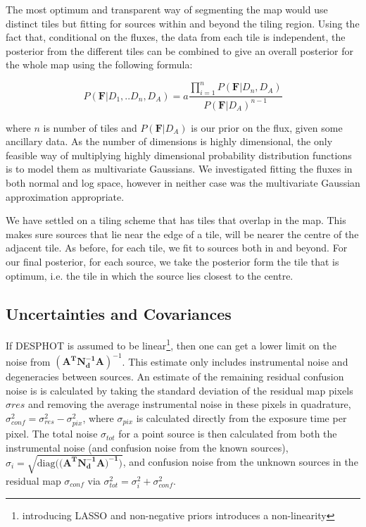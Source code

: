 \documentclass[useAMS,usenatbib]{mn2e}
\begin{document}
The most optimum and transparent way of segmenting the map would use distinct tiles but fitting for sources within and beyond the tiling region. Using the fact that, conditional on the fluxes, the data from each tile is independent, the posterior from the different tiles can be combined to give an overall posterior for the whole map using the following formula:

\begin{equation}
P(\mathbf{F}|D_1,..D_n,D_A)=a\frac{\prod_{i=1}^n P(\mathbf{F}|D_n,D_A)}{P(\mathbf{F}|D_A)^{n-1}}
\end{equation}

where $n$ is number of tiles and $P(\mathbf{F}|D_A)$ is our prior on the flux, given some ancillary data. As the number of dimensions is highly dimensional, the only feasible way of multiplying highly dimensional probability distribution functions is to model them as multivariate Gaussians. We investigated fitting the fluxes in both normal and log space, however in neither case was the multivariate Gaussian approximation appropriate.

We have settled on a tiling scheme that has tiles that overlap in the map. This makes sure sources that lie near the edge of a tile, will be nearer the centre of the adjacent tile. As before, for each tile, we fit to sources both in and beyond. For our final posterior, for each source, we take the posterior form the tile that is optimum, i.e. the tile in which the source lies closest to the centre.

\subsection{Uncertainties and Covariances}
If DESPHOT is assumed to be linear\footnote{introducing LASSO and non-negative priors introduces a non-linearity}, then one can get a lower limit on the noise from $(\mathbf{A^TN_d^{-1}A})^{-1}$. This estimate only includes instrumental noise and degeneracies between sources. An estimate of the remaining residual confusion noise is is calculated by taking the standard deviation of the residual map pixels $\sigma{res}$ and removing the average instrumental noise in these pixels in quadrature, $\sigma^2_{conf} = \sigma^2_{res} - \sigma^2_{pix}$, where $\sigma_{pix}$ is calculated directly from the exposure time per pixel. The total noise $\sigma_{tot}$ for a point source is then calculated from both the instrumental noise (and confusion noise from the known sources), $\sigma_{i} = \sqrt{\mathrm{diag}((\mathbf{A^TN^{-1}_dA)^{-1})}}$, and confusion noise from the unknown sources in the residual map $\sigma_{conf}$ via $\sigma^2_{tot} = \sigma^2_{i} + \sigma^2_{conf}$. 
\end{document}
